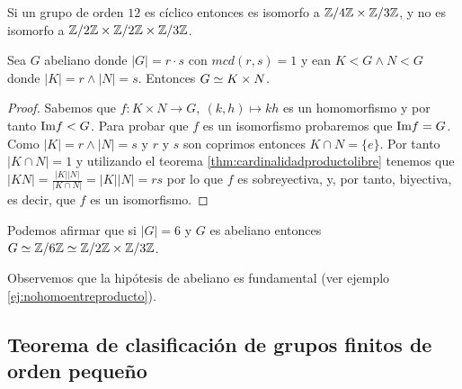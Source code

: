 \begin{ej}
	Si un grupo de orden $12$ es cíclico entonces es isomorfo a $\mathbb{Z}/4\mathbb{Z} \times \mathbb{Z}/3\mathbb{Z}$, y no es isomorfo a $\mathbb{Z}/2\mathbb{Z} \times \mathbb{Z}/2\mathbb{Z} \times \mathbb{Z}/3\mathbb{Z}$.
\end{ej}

\begin{thm}
	Sea $G$ abeliano donde $|G| = r\cdot s$ con $mcd(r,s) = 1$ y ean $K < G \land N < G$ donde $|K| = r \land |N| = s$. Entonces $G \simeq K \times N$.
\end{thm}

\begin{proof}
	Sabemos que $f:K\times N \to G,\ (k, h) \mapsto kh$ es un homomorfismo y por tanto $\text{Im} f < G$. Para probar que $f$ es un isomorfismo probaremos que $\text{Im} f = G$. Como $|K| = r \land |N| = s$ y $r$ y $s$ son coprimos entonces $K \cap N = \{e\}$. Por tanto $|K \cap N| = 1$ y utilizando el teorema \ref{thm:cardinalidadproductolibre} tenemos que $|KN| = \frac{|K||N|}{|K \cap N|} = |K| |N| = rs$ por lo que $f$ es sobreyectiva, y, por tanto, biyectiva, es decir, que $f$ es un isomorfismo.
\end{proof}

\begin{ej}
	Podemos afirmar que si $|G| = 6$ y $G$ es abeliano entonces $G \simeq \mathbb{Z}/6\mathbb{Z} \simeq \mathbb{Z}/2\mathbb{Z} \times \mathbb{Z}/3\mathbb{Z}$.
\end{ej}

Observemos que la hipótesis de abeliano es fundamental (ver ejemplo \ref{ej:nohomoentreproducto}).

\subsection{Teorema de clasificación de grupos finitos de orden pequeño}

\label{gruposfinitosnotables}

